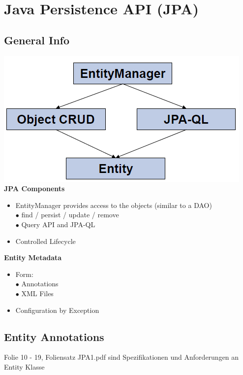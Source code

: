 \documentclass[10pt]{scrartcl}
\newcommand{\Bold}[1]{\textbf{#1}} %
\begin{document}
\newpage
\section{Java Persistence API (JPA)}
\subsection{General Info}
\includegraphics[scale=0.5]{jpa.png}\\
\Bold{JPA Components}
\begin{itemize}
\item EntityManager provides access to the objects (similar to a DAO)\\
$\bullet$ find / persist / update / remove\\
$\bullet$ Query API and JPA-QL
\item Controlled Lifecycle
\end{itemize}
\Bold{Entity Metadata}
\begin{itemize}
\item Form:\\
$\bullet$ Annotations\\
$\bullet$ XML Files
\item Configuration by Exception
\end{itemize}
\subsection{Entity Annotations}

Folie 10 - 19, Foliensatz JPA1.pdf sind Spezifikationen und Anforderungen an Entity Klasse
\end{document}
